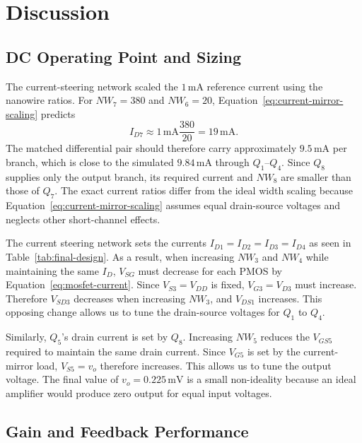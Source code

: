 \documentclass[11pt,a4paper]{article}
\begin{document}
\section{Discussion}

\subsection{DC Operating Point and Sizing}

The current-steering network scaled the $1\,\mathrm{mA}$ reference current using the nanowire ratios. For $NW_7=380$ and $NW_6=20$, Equation~\eqref{eq:current-mirror-scaling} predicts
\begin{equation}
    I_{D7}\approx 1\,\mathrm{mA}\frac{380}{20}=19\,\mathrm{mA}.
\end{equation}
The matched differential pair should therefore carry approximately $9.5\,\mathrm{mA}$ per branch, which is close to the simulated $9.84\,\mathrm{mA}$ through $Q_1$--$Q_4$. 
Since $Q_8$ supplies only the output branch, its required current and $NW_8$ are smaller than those of $Q_7$. The exact current ratios differ from the ideal width scaling because Equation~\eqref{eq:current-mirror-scaling} assumes equal drain-source voltages and neglects other short-channel effects.

The current steering network sets the currents $I_{D1}=I_{D2}=I_{D3}=I_{D4}$ as seen in Table~\ref{tab:final-design}. As a result, when increasing $NW_3$ and $NW_4$ while maintaining the same $I_D$, $V_{SG}$ must decrease for each PMOS by Equation~\eqref{eq:mosfet-current}.
Since $V_{S3} = V_{DD}$ is fixed, $V_{G3} = V_{D3}$ must increase. Therefore $V_{SD3}$ decreases when increasing $NW_3$, and $V_{DS1}$ increases. This opposing change allows us to tune the drain-source voltages for $Q_1$ to $Q_4$.

Similarly, $Q_5$'s drain current is set by $Q_8$. Increasing $NW_5$ reduces the $V_{GS5}$ required to maintain the same drain current. Since $V_{G5}$ is set by the current-mirror load, $V_{S5}=v_o$ therefore increases. This allows us to tune the output voltage. The final value of $v_o=0.225\,\mathrm{mV}$ is a small non-ideality because an ideal amplifier would produce zero output for equal input voltages.
\subsection{Gain and Feedback Performance}
\end{document}
